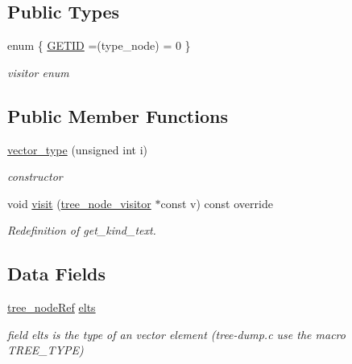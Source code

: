 \subsection*{Public Types}
\begin{DoxyCompactItemize}
\item 
enum \{ \hyperlink{structvector__type_af4d4c935f822ba820237a465ae270518a21156e5d2fb3973025856725b07f2648}{G\+E\+T\+ID} =(type\+\_\+node) = 0
 \}\begin{DoxyCompactList}\small\item\em visitor enum \end{DoxyCompactList}
\end{DoxyCompactItemize}
\subsection*{Public Member Functions}
\begin{DoxyCompactItemize}
\item 
\hyperlink{structvector__type_a07a949a0a22f75791b1f33ce92137998}{vector\+\_\+type} (unsigned int i)
\begin{DoxyCompactList}\small\item\em constructor \end{DoxyCompactList}\item 
void \hyperlink{structvector__type_a628f2913374a823ed425afdd76197459}{visit} (\hyperlink{classtree__node__visitor}{tree\+\_\+node\+\_\+visitor} $\ast$const v) const override
\begin{DoxyCompactList}\small\item\em Redefinition of get\+\_\+kind\+\_\+text. \end{DoxyCompactList}\end{DoxyCompactItemize}
\subsection*{Data Fields}
\begin{DoxyCompactItemize}
\item 
\hyperlink{tree__node_8hpp_a6ee377554d1c4871ad66a337eaa67fd5}{tree\+\_\+node\+Ref} \hyperlink{structvector__type_a6a0da84b1018518e3977538d55d995a3}{elts}
\begin{DoxyCompactList}\small\item\em field elts is the type of an vector element (tree-\/dump.\+c use the macro T\+R\+E\+E\+\_\+\+T\+Y\+PE) \end{DoxyCompactList}\end{DoxyCompactItemize}
